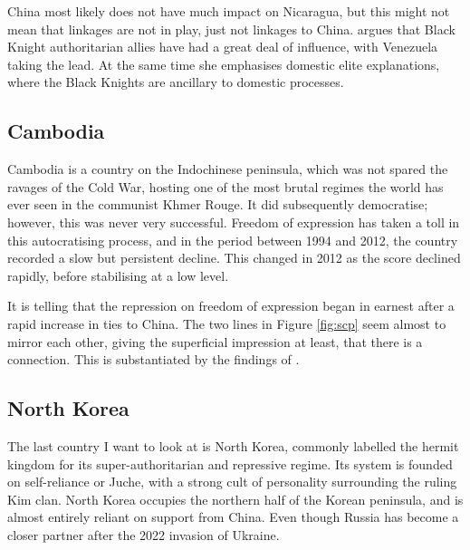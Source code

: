 China most likely does not have much impact on Nicaragua, but this might not mean that linkages are not in play, just not linkages to China. \citet[p. 198]{mcconnell_elite_2024} argues that Black Knight authoritarian allies have had a great deal of influence, with Venezuela taking the lead. At the same time she emphasises domestic elite explanations, where the Black Knights are ancillary to domestic processes.

\subsection{Cambodia}
Cambodia is a country on the Indochinese peninsula, which was not spared the ravages of the Cold War, hosting one of the most brutal regimes the world has ever seen in the communist Khmer Rouge. It did subsequently democratise; however, this was never very successful. Freedom of expression has taken a toll in this autocratising process, and in the period between 1994 and 2012, the country recorded a slow but persistent decline. This changed in 2012 as the score declined rapidly, before stabilising at a low level.

It is telling that the repression on freedom of expression began in earnest after a rapid increase in ties to China. The two lines in Figure \ref{fig:scp} seem almost to mirror each other, giving the superficial impression at least, that there is a connection. This is substantiated by the findings of \citet{loughlin_chinese_2021}.

\subsection{North Korea}
The last country I want to look at is North Korea, commonly labelled the hermit kingdom for its super-authoritarian and repressive regime. Its system is founded on self-reliance or Juche, with a strong cult of personality surrounding the ruling Kim clan. North Korea occupies the northern half of the Korean peninsula, and is almost entirely reliant on support from China. Even though Russia has become a closer partner after the 2022 invasion of Ukraine. 

